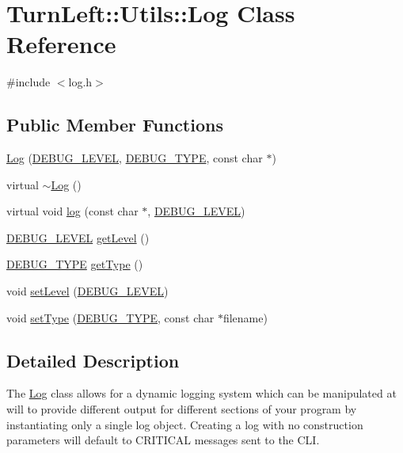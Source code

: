 \hypertarget{classTurnLeft_1_1Utils_1_1Log}{
\section{TurnLeft::Utils::Log Class Reference}
\label{classTurnLeft_1_1Utils_1_1Log}
}


{\ttfamily \#include $<$log.h$>$}

\subsection*{Public Member Functions}
\begin{DoxyCompactItemize}
\item 
\hyperlink{classTurnLeft_1_1Utils_1_1Log_aad9a535b7774066baec2ae69f95dc810}{Log} (\hyperlink{namespaceTurnLeft_1_1Utils_a55225b27548ba5d55b26a6a5f1ba294e}{DEBUG\_\-LEVEL}, \hyperlink{namespaceTurnLeft_1_1Utils_a9d1cba01e5417c6262d11cc154c9a252}{DEBUG\_\-TYPE}, const char $\ast$)
\item 
virtual \hyperlink{classTurnLeft_1_1Utils_1_1Log_ac04ffbc97a2d6689843fd11492fe8911}{$\sim$Log} ()
\item 
virtual void \hyperlink{classTurnLeft_1_1Utils_1_1Log_ac14c5605af087f81b2c99b1c267af13d}{log} (const char $\ast$, \hyperlink{namespaceTurnLeft_1_1Utils_a55225b27548ba5d55b26a6a5f1ba294e}{DEBUG\_\-LEVEL})
\item 
\hyperlink{namespaceTurnLeft_1_1Utils_a55225b27548ba5d55b26a6a5f1ba294e}{DEBUG\_\-LEVEL} \hyperlink{classTurnLeft_1_1Utils_1_1Log_a388ce24cc5be57d7b625d760b6ef708e}{getLevel} ()
\item 
\hyperlink{namespaceTurnLeft_1_1Utils_a9d1cba01e5417c6262d11cc154c9a252}{DEBUG\_\-TYPE} \hyperlink{classTurnLeft_1_1Utils_1_1Log_a94ca126124af5c0f1058f60e1130d94b}{getType} ()
\item 
void \hyperlink{classTurnLeft_1_1Utils_1_1Log_a88c51f5e9b80a18eb9c79340d2551557}{setLevel} (\hyperlink{namespaceTurnLeft_1_1Utils_a55225b27548ba5d55b26a6a5f1ba294e}{DEBUG\_\-LEVEL})
\item 
void \hyperlink{classTurnLeft_1_1Utils_1_1Log_ad27d1e632681c4cf80f352682e63df06}{setType} (\hyperlink{namespaceTurnLeft_1_1Utils_a9d1cba01e5417c6262d11cc154c9a252}{DEBUG\_\-TYPE}, const char $\ast$filename)
\end{DoxyCompactItemize}


\subsection{Detailed Description}
The \hyperlink{classTurnLeft_1_1Utils_1_1Log}{Log} class allows for a dynamic logging system which can be manipulated at will to provide different output for different sections of your program by instantiating only a single log object. Creating a log with no construction parameters will default to CRITICAL messages sent to the CLI. 

